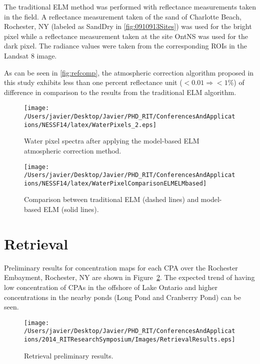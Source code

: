 The traditional ELM method was performed with reflectance measurements taken in the field. A reflectance measurement taken of the sand of Charlotte Beach, Rochester, NY (labeled as SandDry in \autoref{fig:0910913Sites}) was used for the bright pixel while a reflectance measurement taken at the site OntNS was used for the dark pixel. The radiance values were taken from the corresponding ROIs in the Landsat 8 image. 

As can be seen in \autoref{fig:refcomp}, the atmospheric correction algorithm proposed in this study exhibits less than one percent reflectance unit ($<0.01\Rightarrow <1\%$) of difference in comparison to the results from the traditional ELM algorithm.

\begin{figure}[htb]
  \begin{minipage}[c]{0.48\linewidth}
    \centering
      \texttt{[image: /Users/javier/Desktop/Javier/PHD\_RIT/ConferencesAndApplications/NESSF14/latex/WaterPixels\_2.eps]}
      \caption{Water pixel spectra after applying the model-based ELM atmospheric correction method.}
      \label{fig:waterpxs}
  \end{minipage}
  \hfill
  \begin{minipage}[d]{0.48\linewidth}
    \centering
      \texttt{[image: /Users/javier/Desktop/Javier/PHD\_RIT/ConferencesAndApplications/NESSF14/latex/WaterPixelComparisonELMELMbased]}
      \caption{Comparison between traditional ELM (dashed lines) and model-based ELM (solid lines).}
      \label{fig:refcomp}
  \end{minipage}
\end{figure}


\section{Retrieval}

Preliminary results for concentration maps for each CPA over the Rochester Embayment, Rochester, NY are shown in Figure~\ref{fig:retrievalresults}. The expected trend of having low concentration of CPAs in the offshore of Lake Ontario and higher concentrations in the nearby ponds (Long Pond and Cranberry Pond) can be seen. 
\begin{figure}[htb]
\centering
\texttt{[image: /Users/javier/Desktop/Javier/PHD\_RIT/ConferencesAndApplications/2014\_RITResearchSymposium/Images/RetrievalResults.eps]}
   \caption{Retrieval preliminary results.}
      \label{fig:retrievalresults}   
\end{figure}

